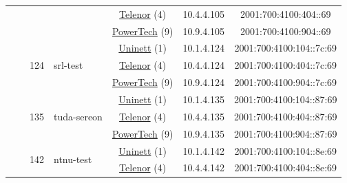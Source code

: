 \begin{small}
\begin{center}
\begin{longtable}{|c|c|c|c|c|c|c|c|}
  &  & \multicolumn{2}{|c|}{} & \multicolumn{2}{|c|}{\tiny{\href{https://www.telenor.no}{Telenor} (4)}} & \tiny{10.4.4.105} & \tiny{2001:700:4100:404::69} \\* \cline{5-5}\cline{6-6}\cline{7-7}\cline{8-8}
  &  & \multicolumn{2}{|c|}{} & \multicolumn{2}{|c|}{\tiny{\href{http://www.powertech.no}{PowerTech} (9)}} & \tiny{10.9.4.105} & \tiny{2001:700:4100:904::69} \\* \cline{3-3}\cline{4-4}\cline{5-5}\cline{6-6}\cline{7-7}\cline{8-8}
  &  & \multirow{3}{*}{\tiny{124}} & \multicolumn{1}{|l|}{\multirow{3}{*}{\tiny{srl-test}}} & \multicolumn{2}{|c|}{\tiny{\href{https://www.uninett.no}{Uninett} (1)}} & \tiny{10.1.4.124} & \tiny{2001:700:4100:104::7c:69} \\* \cline{5-5}\cline{6-6}\cline{7-7}\cline{8-8}
  &  &  &  & \multicolumn{2}{|c|}{\tiny{\href{https://www.telenor.no}{Telenor} (4)}} & \tiny{10.4.4.124} & \tiny{2001:700:4100:404::7c:69} \\* \cline{5-5}\cline{6-6}\cline{7-7}\cline{8-8}
  &  &  &  & \multicolumn{2}{|c|}{\tiny{\href{http://www.powertech.no}{PowerTech} (9)}} & \tiny{10.9.4.124} & \tiny{2001:700:4100:904::7c:69} \\* \cline{3-3}\cline{4-4}\cline{5-5}\cline{6-6}\cline{7-7}\cline{8-8}
  &  & \multirow{3}{*}{\tiny{135}} & \multicolumn{1}{|l|}{\multirow{3}{*}{\tiny{tuda-sereon}}} & \multicolumn{2}{|c|}{\tiny{\href{https://www.uninett.no}{Uninett} (1)}} & \tiny{10.1.4.135} & \tiny{2001:700:4100:104::87:69} \\* \cline{5-5}\cline{6-6}\cline{7-7}\cline{8-8}
  &  &  &  & \multicolumn{2}{|c|}{\tiny{\href{https://www.telenor.no}{Telenor} (4)}} & \tiny{10.4.4.135} & \tiny{2001:700:4100:404::87:69} \\* \cline{5-5}\cline{6-6}\cline{7-7}\cline{8-8}
  &  &  &  & \multicolumn{2}{|c|}{\tiny{\href{http://www.powertech.no}{PowerTech} (9)}} & \tiny{10.9.4.135} & \tiny{2001:700:4100:904::87:69} \\* \cline{3-3}\cline{4-4}\cline{5-5}\cline{6-6}\cline{7-7}\cline{8-8}
  &  & \multirow{3}{*}{\tiny{142}} & \multicolumn{1}{|l|}{\multirow{3}{*}{\tiny{ntnu-test}}} & \multicolumn{2}{|c|}{\tiny{\href{https://www.uninett.no}{Uninett} (1)}} & \tiny{10.1.4.142} & \tiny{2001:700:4100:104::8e:69} \\* \cline{5-5}\cline{6-6}\cline{7-7}\cline{8-8}
  &  &  &  & \multicolumn{2}{|c|}{\tiny{\href{https://www.telenor.no}{Telenor} (4)}} & \tiny{10.4.4.142} & \tiny{2001:700:4100:404::8e:69} \\* \cline{5-5}\cline{6-6}\cline{7-7}\cline{8-8}

\end{longtable}
\end{center}
\end{small}
